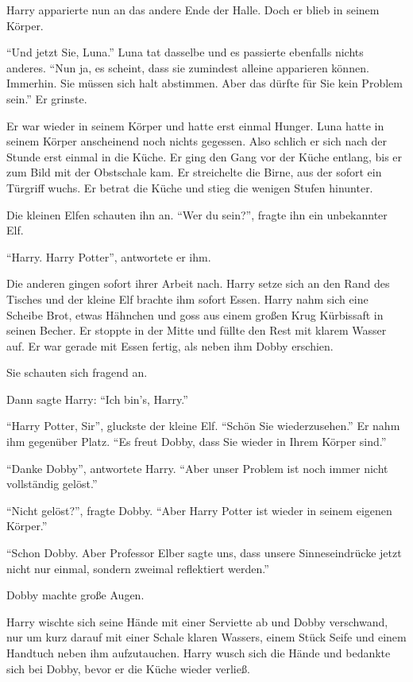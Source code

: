 Harry apparierte nun an das andere Ende der Halle. Doch er blieb in seinem Körper.

\enquote{Und jetzt Sie, Luna.} Luna tat dasselbe und es passierte ebenfalls nichts anderes. \enquote{Nun ja, es scheint, dass sie zumindest alleine apparieren können. Immerhin. Sie müssen sich halt abstimmen. Aber das dürfte für Sie kein Problem sein.} Er grinste.

Er war wieder in seinem Körper und hatte erst einmal Hunger. Luna hatte in seinem Körper anscheinend noch nichts gegessen. Also schlich er sich nach der Stunde erst einmal in die Küche. Er ging den Gang vor der Küche entlang, bis er zum Bild mit der Obstschale kam. Er streichelte die Birne, aus der sofort ein Türgriff wuchs. Er betrat die Küche und stieg die wenigen Stufen hinunter.

Die kleinen Elfen schauten ihn an. \enquote{Wer du sein?}, fragte ihn ein unbekannter Elf.

\enquote{Harry. Harry Potter}, antwortete er ihm.

Die anderen gingen sofort ihrer Arbeit nach. Harry setze sich an den Rand des Tisches und der kleine Elf brachte ihm sofort Essen. Harry nahm sich eine Scheibe Brot, etwas Hähnchen und goss aus einem großen Krug Kürbissaft in seinen Becher. Er stoppte in der Mitte und füllte den Rest mit klarem Wasser auf. Er war gerade mit Essen fertig, als neben ihm Dobby erschien.

Sie schauten sich fragend an.

Dann sagte Harry: \enquote{Ich bin's, Harry.}

\enquote{Harry Potter, Sir}, gluckste der kleine Elf. \enquote{Schön Sie wiederzusehen.} Er nahm ihm gegenüber Platz. \enquote{Es freut Dobby, dass Sie wieder in Ihrem Körper sind.}

\enquote{Danke Dobby}, antwortete Harry. \enquote{Aber unser Problem ist noch immer nicht vollständig gelöst.}

\enquote{Nicht gelöst?}, fragte Dobby. \enquote{Aber Harry Potter ist wieder in seinem eigenen Körper.}

\enquote{Schon Dobby. Aber Professor Elber sagte uns, dass unsere Sinneseindrücke jetzt nicht nur einmal, sondern zweimal reflektiert werden.}

Dobby machte große Augen.

Harry wischte sich seine Hände mit einer Serviette ab und Dobby verschwand, nur um kurz darauf mit einer Schale klaren Wassers, einem Stück Seife und einem Handtuch neben ihm aufzutauchen. Harry wusch sich die Hände und bedankte sich bei Dobby, bevor er die Küche wieder verließ.

